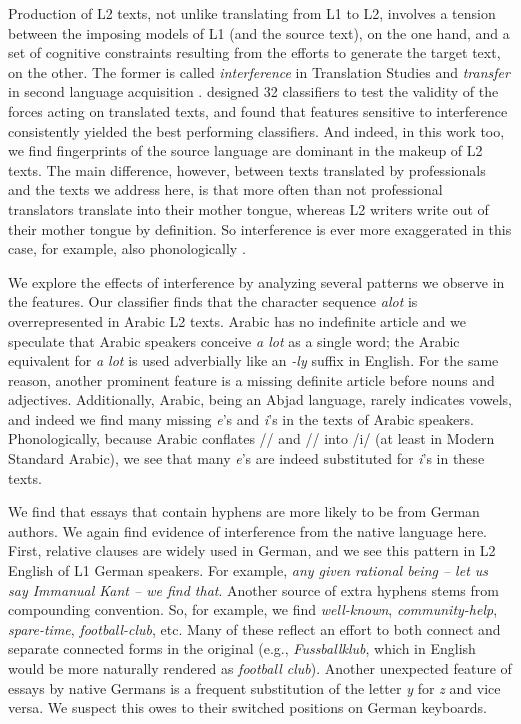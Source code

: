 \documentclass[11pt,letterpaper]{article}
\newcommand{\citep}[1]{\cite{#1}}
\newcommand{\citet}[1]{\newcite{#1}}
\newcommand{\textnl}{\textit}
\begin{document}
Production of L2 texts, not unlike translating from L1 to L2, involves
a tension between the imposing models of L1 (and the source text), on
the one hand, and a set of cognitive constraints resulting from the
efforts to generate the target text, on the other. The former is
called \emph{interference} in Translation Studies \citep{Toury:1995}
and \emph{transfer} in second language acquisition
\citep{Selinker1972}. \citet{vered:noam:shuly} designed 32 classifiers to test the validity
of the forces acting on translated texts, and found that features sensitive to interference
consistently yielded the best performing classifiers. And indeed, in
this work too, we find fingerprints of the source language are dominant in the
makeup of L2 texts. The main difference, however, between texts translated by
professionals and the texts we address here, is that more often than
not professional translators translate into their mother tongue,
whereas L2 writers write out of their mother tongue by definition. So
interference is ever more exaggerated in this case, for example, also
phonologically \citep{tsur-rappoport:2007:Cognitive-2007}.

We explore the effects of interference by analyzing several patterns we observe in the features.
Our classifier finds that the
character sequence \textnl{alot} is overrepresented in Arabic L2
texts. Arabic has no indefinite article and we speculate that Arabic
speakers conceive \textnl{a lot} as a single word; the Arabic
equivalent for \textnl{a lot} is used adverbially like an \textnl{-ly}
suffix in English. For the same reason, another prominent feature is a
missing definite article before nouns and adjectives. Additionally,
Arabic, being an Abjad language, rarely indicates vowels, and indeed
we find many missing \textnl{e}'s and \textnl{i}'s in the texts of
Arabic speakers. Phonologically, because Arabic conflates
// and // into /i/ (at least in Modern Standard
Arabic), we see that many \textnl{e}'s are indeed substituted for
\textnl{i}'s in these texts.

We find that essays that contain hyphens are more likely to be from German authors. We again find evidence of interference from the native language here. First, relative clauses are widely used in German, and we see this pattern in L2 English of L1 German speakers. For example, \textnl{any
  given rational being -- let us say Immanual Kant -- we find
  that}. Another source of extra hyphens stems from compounding convention. So, for example, we find \textnl{well-known},
\textnl{community-help}, \textnl{spare-time}, \textnl{football-club},
etc. Many of these reflect an effort to both connect and separate
connected forms in the original (e.g., \textnl{Fussballklub}, which in
English would be more naturally rendered as \textnl{football club}).
Another unexpected feature of essays by native Germans is a frequent substitution of the
letter \textnl{y} for \textnl{z} and vice versa. We suspect this owes to their switched positions on German keyboards.
 
\end{document}
